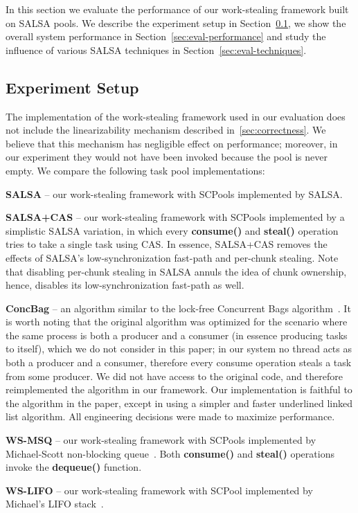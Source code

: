 In this section we evaluate the performance of our work-stealing framework built on SALSA pools. 
We describe the experiment setup in Section~\ref{sec:exp-setup}, we show the overall system performance in Section~\ref{sec:eval-performance} and study the influence of various SALSA techniques in Section~\ref{sec:eval-techniques}.
\negspace
\subsection {Experiment Setup}
\label{sec:exp-setup}
The implementation of the work-stealing framework used in our evaluation does not include the linearizability mechanism described in~\ref{sec:correctness}. We believe that this mechanism has negligible effect on performance; moreover, in our experiment they would not have been invoked because the pool is never empty. We compare the following task pool implementations:
\begin {item*}
\item
{\bf SALSA} -- our work-stealing framework with SCPools implemented by SALSA.
\item
{\bf SALSA+CAS} -- our work-stealing framework with SCPools implemented by a simplistic SALSA variation, in which every {\bf consume()} and {\bf steal()} operation tries to take a single task using CAS. In essence, SALSA+CAS removes the effects of SALSA's low-synchronization fast-path and per-chunk stealing. 
Note that disabling per-chunk stealing in SALSA annuls the idea of chunk ownership, hence, disables its low-synchronization fast-path as well. 
\item
{\bf ConcBag} -- an algorithm similar to the lock-free Concurrent Bags algorithm~\cite{Sundell:2011:LAC:1989493.1989550}. 
It is worth noting that the original algorithm was optimized for the scenario where the same process is both a producer and a consumer (in essence producing tasks to itself), which we do not consider in this paper; in our system no thread acts as both a producer and a consumer, therefore every consume operation steals a task from some producer.
We did not have access to the original code, and therefore reimplemented the algorithm in our framework. Our implementation is faithful to the algorithm in the paper, except in using a simpler and faster underlined linked list algorithm. All engineering decisions were made to maximize performance. 
\item
{\bf WS-MSQ} -- our work-stealing framework with SCPools implemented by Michael-Scott non-blocking queue~\cite{Michael:1996:SFP:248052.248106}. Both {\bf consume()} and {\bf steal()} operations invoke the {\bf dequeue()} function. 
\item
{\bf WS-LIFO} -- our work-stealing framework with SCPool implemented by Michael's LIFO stack~\cite{Michael:2004:HPS:987524.987595}. 
\end {item*} 

